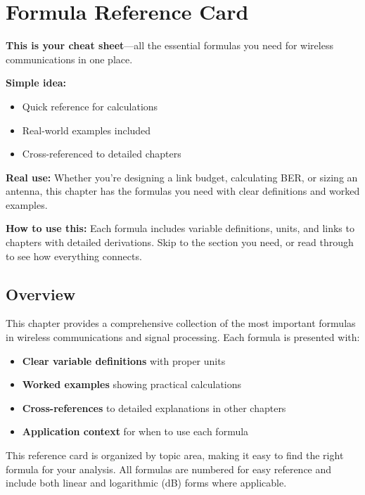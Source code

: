 \chapter{Formula Reference Card}
\label{ch:formula-reference}

\begin{nontechnical}
\textbf{This is your cheat sheet}---all the essential formulas you need for wireless communications in one place.

\textbf{Simple idea:}
\begin{itemize}
\item Quick reference for calculations
\item Real-world examples included
\item Cross-referenced to detailed chapters
\end{itemize}

\textbf{Real use:} Whether you're designing a link budget, calculating BER, or sizing an antenna, this chapter has the formulas you need with clear definitions and worked examples.

\textbf{How to use this:} Each formula includes variable definitions, units, and links to chapters with detailed derivations. Skip to the section you need, or read through to see how everything connects.
\end{nontechnical}

\section{Overview}

This chapter provides a comprehensive collection of the most important formulas in wireless communications and signal processing. Each formula is presented with:

\begin{itemize}
\item \textbf{Clear variable definitions} with proper units
\item \textbf{Worked examples} showing practical calculations
\item \textbf{Cross-references} to detailed explanations in other chapters
\item \textbf{Application context} for when to use each formula
\end{itemize}

\begin{keyconcept}
This reference card is organized by topic area, making it easy to find the right formula for your analysis. All formulas are numbered for easy reference and include both linear and logarithmic (dB) forms where applicable.
\end{keyconcept}

